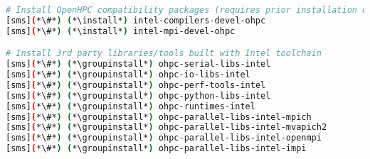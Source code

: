 \begin{lstlisting}[language=bash,keywords={},upquote=true,keepspaces]
# Install OpenHPC compatibility packages (requires prior installation of Parallel Studio)
[sms](*\#*) (*\install*) intel-compilers-devel-ohpc
[sms](*\#*) (*\install*) intel-mpi-devel-ohpc

# Install 3rd party libraries/tools built with Intel toolchain
[sms](*\#*) (*\groupinstall*) ohpc-serial-libs-intel
[sms](*\#*) (*\groupinstall*) ohpc-io-libs-intel
[sms](*\#*) (*\groupinstall*) ohpc-perf-tools-intel
[sms](*\#*) (*\groupinstall*) ohpc-python-libs-intel
[sms](*\#*) (*\groupinstall*) ohpc-runtimes-intel
[sms](*\#*) (*\groupinstall*) ohpc-parallel-libs-intel-mpich
[sms](*\#*) (*\groupinstall*) ohpc-parallel-libs-intel-mvapich2
[sms](*\#*) (*\groupinstall*) ohpc-parallel-libs-intel-openmpi
[sms](*\#*) (*\groupinstall*) ohpc-parallel-libs-intel-impi
\end{lstlisting}

